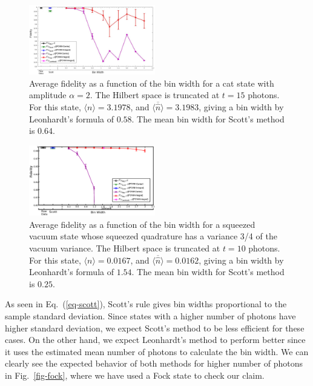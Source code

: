 \documentclass[
reprint,
superscriptaddress,
showpacs,
amsmath,
amssymb,
aps,
pra,
longbibliography
]{revtex4-1}
\begin{document}
\begin{figure}
  \includegraphics[width=0.49\textwidth]{catstate-alpha=2-15photons.eps}
  \caption{Average fidelity as a function of the bin width for a cat
    state with amplitude $\alpha = 2$. The Hilbert space is truncated
    at $t=15$ photons. For this state, $\langle n \rangle = 3.1978$, and 
    $\overline{\langle \hat{n} \rangle}=3.1983$, giving a bin width by
    Leonhardt's formula of $0.58$.  The mean bin width for Scott's
    method is $0.64$.}
  \label{fig-Fid_vs_binwidth_catstate_alpha_2_Mph_15}
\end{figure}

\begin{figure}
  \includegraphics[width=0.49\textwidth]{squeezedvacuum-10photons-var=075.eps}
  \caption{Average fidelity as a function of the bin width for a
    squeezed vacuum state whose squeezed quadrature has a variance 3/4
    of the vacuum variance. The Hilbert space is truncated at $t=10$
    photons. For this state, $\langle n \rangle = 0.0167$, and
    $\overline{\langle \hat{n} \rangle}=0.0162$, giving a bin width by
    Leonhardt's formula of $1.54$.  The mean bin width for Scott's
    method is $0.25$.}
  \label{fig-squeezed_vacuum_variance_075_Mph_10}
\end{figure}

As seen in Eq.~(\ref{eq-scott}), Scott's rule gives bin widths proportional
to the sample standard deviation. Since states with a higher number of 
photons have higher standard deviation, we expect Scott's method to be less
efficient for these cases. On the other hand, we expect Leonhardt's method
to perform better since it uses the estimated mean number of photons to calculate
the bin width. We can clearly see the expected behavior 
of both methods for higher number of photons in Fig.~\ref{fig-fock}, where we
have used a Fock state to check our claim.
\end{document}
